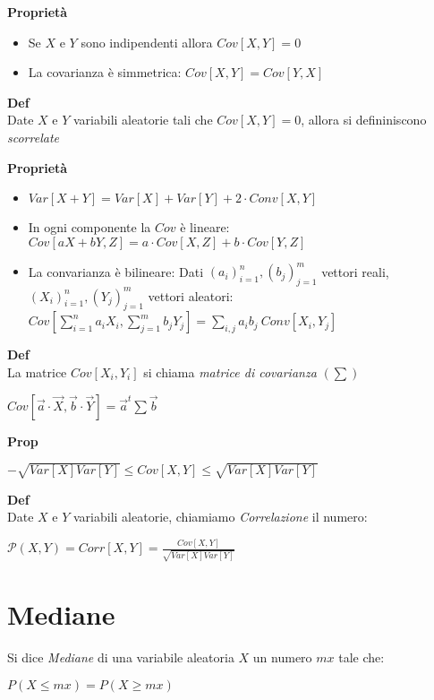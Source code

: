 \documentclass[11pt, letterpaper]{article}
\begin{document}
\newpage
\textbf{Proprietà}
\begin{itemize}
    \item Se $X$ e $Y$ sono indipendenti allora $Cov[X,Y]=0$
    \item La covarianza è simmetrica: $Cov[X,Y]=Cov[Y,X]$
\end{itemize}

\textbf{Def}\\Date $X$ e $Y$ variabili aleatorie tali che $Cov[X,Y]=0$, allora si defininiscono
\textit{scorrelate}

\textbf{Proprietà}
\begin{itemize}
    \item $Var[X+Y]=Var[X]+Var[Y]+2\cdot Conv[X,Y]$
    \item In ogni componente la $Cov$ è lineare:
    \subitem $Cov[aX+bY,Z]=a\cdot Cov[X,Z]+b\cdot Cov[Y,Z]$ 
    \item La convarianza è bilineare:
    \subitem Dati $(a_{i})^{n}_{i=1},(b_{j})^{m}_{j=1}$ vettori reali, $(X_{i})^{n}_{i=1},
    (Y_{j})^{m}_{j=1}$ vettori aleatori:
    \subitem $Cov[\sum^{n}_{i=1} a_{i}X_{i},\sum^{m}_{j=1}b_{j}Y_{j}]=\sum_{i,j}a_{i}b_{j}\ 
    Conv[X_{i},Y_{j}]$
\end{itemize}

\textbf{Def}\\ La matrice $Cov[X_{i},Y_{i}]$ si chiama \textit{matrice di covarianza} $(\sum)$
\begin{center}
    $Cov[\vec{a}\cdot\vec{X},\vec{b}\cdot\vec{Y}]=\vec{a}^{t}\sum\vec{b}$
\end{center}

\textbf{Prop}
\begin{center}
    $-\sqrt{Var[X]Var[Y]}\leq Cov[X,Y]\leq\sqrt{Var[X]Var[Y]}$
\end{center}

\textbf{Def}\\Date $X$ e $Y$ variabili aleatorie, chiamiamo \textit{Correlazione} il numero:
\begin{center}
    $\mathcal{P}(X,Y)=Corr[X,Y]=\frac{Cov[X,Y]}{\sqrt{Var[X]Var[Y]}}$
\end{center}


\section{Mediane}
Si dice \textit{Mediane} di una variabile aleatoria $X$ un numero $mx$ tale che:
\begin{center}
    $P(X\leq mx)=P(X\geq mx)$
\end{center}
\end{document}
